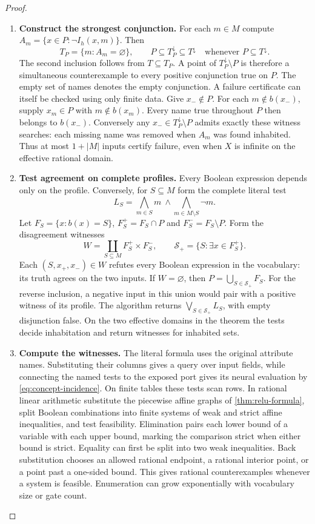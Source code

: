 \documentclass[11pt,a4paper]{article}
\theoremstyle{definition}
\theoremstyle{remark}\newaliascnt{remark}{theorem}
\numberwithin{equation}{section}
\begin{document}
\begin{proof}\leavevmode
\begin{enumerate}[titledsteps]
    \item \textbf{Construct the strongest conjunction.} For each \(m\in M\) compute \(A_m=\{x\in P:\neg I_h(x,m)\}\). Then
\[
 T_P=\{m:A_m=\varnothing\},\qquad
 P\subseteq T_P^\downarrow\subseteq T^\downarrow
                 \quad\text{whenever }P\subseteq T^\downarrow .
\]
The second inclusion follows from \(T\subseteq T_P\). A point of \(T_P^\downarrow\setminus P\) is therefore a simultaneous counterexample to every positive conjunction true on \(P\). The empty set of names denotes the empty conjunction.
A failure certificate can itself be checked using only finite data. Give \(x_-\notin P\). For each \(m\notin b(x_-)\), supply \(x_m\in P\) with \(m\notin b(x_m)\). Every name true throughout \(P\) then belongs to \(b(x_-)\). Conversely any \(x_-\in T_P^\downarrow\setminus P\) admits exactly these witness searches: each missing name was removed when \(A_m\) was found inhabited. Thus at most \(1+|M|\) inputs certify failure, even when \(X\) is infinite on the effective rational domain.

    \item \textbf{Test agreement on complete profiles.} Every Boolean expression depends only on the profile. Conversely, for $S\subseteq M$ form the complete literal test
\[
 L_S=\bigwedge_{m\in S}m\ \wedge\!
       \bigwedge_{m\in M\setminus S}\neg m .
\]
Let \(F_S=\{x:b(x)=S\}\), \(F_S^+=F_S\cap P\) and \(F_S^-=F_S\setminus P\). Form the disagreement witnesses
\[
 W=\coprod_{S\subseteq M}F_S^+\times F_S^- ,\qquad
 \mathcal S_+=\{S:\exists x\in F_S^+\}.
\]
Each \((S,x_+,x_-)\in W\) refutes every Boolean expression in the vocabulary: its truth agrees on the two inputs. If \(W=\varnothing\), then \(P=\bigcup_{S\in\mathcal S_+}F_S\). For the reverse inclusion, a negative input in this union would pair with a positive witness of its profile. The algorithm returns \(\bigvee_{S\in\mathcal S_+}L_S\), with empty disjunction false. On the two effective domains in the theorem the tests decide inhabitation and return witnesses for inhabited sets.


    \item \textbf{Compute the witnesses.} The literal formula uses the original attribute names. Substituting their columns gives a query over input fields, while connecting the named tests to the exposed port gives its neural evaluation by \eqref{eq:concept-incidence}. On finite tables these tests scan rows. In rational linear arithmetic substitute the piecewise affine graphs of \cref{thm:relu-formula}, split Boolean combinations into finite systems of weak and strict affine inequalities, and test feasibility. Elimination pairs each lower bound of a variable with each upper bound, marking the comparison strict when either bound is strict. Equality can first be split into two weak inequalities. Back substitution chooses an allowed rational endpoint, a rational interior point, or a point past a one-sided bound. This gives rational counterexamples whenever a system is feasible. Enumeration can grow exponentially with vocabulary size or gate count.\qedhere
\end{enumerate}
\end{proof}
\end{document}
